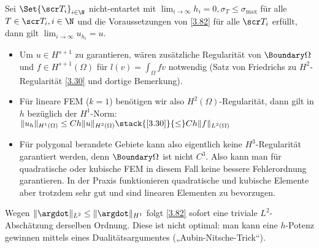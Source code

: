 \begin{kor} \label{3.83}
	Sei $\Set{\scr T_i}_{i\in \N}$ nicht-entartet mit $\lim_{i \to \infty} h_i = 0, \sigma_T \le \sigma_{\text{max}}$ für alle $T \in \scr T_i, i \in \N$ und die Voraussetzungen von \ref{3.82} für alle $\scr T_i$ erfüllt, dann gilt
	\begin{math}
		\lim_{i \to \infty} u_{h_i} = u.
	\end{math}
	\begin{note}
		\begin{itemize}
			\item
				Um $u \in H^{s+1}$ zu garantieren, wären zusätzliche Regularität von $\Boundary \Omega$ und $f \in H^{s+1}(\Omega)$ für $l(v) = \int_\Omega f v$ notwendig (Satz von Friedrichs zu $H^2$-Regularität \ref{3.30} und dortige Bemerkung).
			\item
				Für lineare FEM ($k = 1$) benötigen wir also $H^2(\Omega)$-Regularität, dann gilt  in $h$ bezüglich der $H^1$-Norm:
				\begin{math}
					\|u_h\|_{H^1(\Omega)} \le C h \|u\|_{H^2(\Omega)}
					\stack{\ref{3.30}}{\le} C h \|f\|_{L^2(\Omega)}
				\end{math}
			\item
				Für polygonal berandete Gebiete kann also eigentlich keine $H^3$-Regularität garantiert werden, denn $\Boundary \Omega$ ist nicht $C^3$.
				Also kann man für quadratische oder kubische FEM in diesem Fall keine bessere Fehlerordnung garantieren.
				In der Praxis funktionieren quadratische und kubische Elemente aber trotzdem sehr gut und sind linearen Elementen zu bevorzugen.
		\end{itemize}
	\end{note}
\end{kor}


Wegen $\|\argdot\|_{L^2} \le \|\argdot\|_{H^1}$ folgt \ref{3.82} sofort eine triviale $L^2$-Abschätzung derselben Ordnung.
Diese ist nicht optimal: man kann eine $h$-Potenz gewinnen mittels eines Dualitätsargumentes („Aubin-Nitsche-Trick“).

